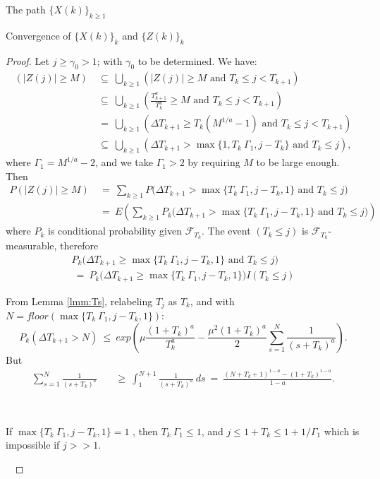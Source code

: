 \documentclass[12pt]{article}
\begin{document}
\begin{section}{The path $\{X(k)\}_{k\ge1}$ }
\begin{subsection}{Convergence of $\{X(k)\}_k$ and $\{Z(k)\}_k$}
\begin{proof}
Let $j \ge \gamma_0 > 1$; with $\gamma_0$ to be determined. We have:
\begin{align*}
(|Z(j)| \ge M) &~\subseteq~ \bigcup_{k \ge 1} (|Z(j)| \ge M \text{ and } T_k \le j < T_{k+1}) \\
&~\subseteq~ \bigcup_{k \ge 1} ( \frac{T_{k+1}^a}{T_{k}^a} \ge M \text{ and } T_k \le j < T_{k+1}) \\
&~=~ \bigcup_{k \ge 1} ( \Delta T_{k+1} \ge T_{k}(M^{1/a} -1) \text{ and } T_k \le j < T_{k+1}) \\
&~\subseteq~ \bigcup_{k \ge 1} ( \Delta T_{k+1} > \max\{1, T_{k} \ \Gamma_1, j - T_k\} \text{ and } T_k \le j ) ,
\end{align*}
where $\Gamma_1 = M^{1/a}-2$, and we take $\Gamma_1 > 2$ by requiring $M$ to be large enough. Then
\begin{align*}
P(|Z(j)| \ge M) &~=~ \sum_{k \ge 1} P\big( \Delta T_{k+1} > \max\{T_{k} \ \Gamma_1, j - T_k,1\} \text{ and } T_k \le j \big) \\
&~=~ E\left( \sum_{k \ge 1} P_k\big( \Delta T_{k+1} > \max\{T_{k} \ \Gamma_1, j - T_k, 1\} \text{ and } T_k \le j \big) \right) 
\end{align*}
where  $P_{k}$ is conditional probability given $\mathcal{F}_{T_k}$. The event $(T_k \le j)$ is $\mathcal{F}_{T_k}$-measurable, therefore
\begin{align*}
& P_k\Big( \Delta T_{k+1} \ge \max\{T_{k} \ \Gamma_1, j - T_k,1\} \text{ and } T_k \le j \Big)  &\\
& ~=~ P_k\Big( \Delta T_{k+1} \ge \max\{T_{k} \ \Gamma_1, j - T_k,1\}\Big) I(T_k \le j ) &
\end{align*}

From Lemma \ref{lmm:Ts}, relabeling $T_j$ as $T_k$, and with
 $N = floor(\max\{T_{k} \ \Gamma_1, j - T_k,1\})$:
$$
P_k( \Delta T_{k+1} > N) ~\le~
exp\left( 
\mu  \frac{(1+T_k)^a}{T_k^a} 
- \frac{\mu^2 (1+T_k)^a}{2} \sum_{s=1}^{N} \frac{1}{{(s+T_k)}^a}  \right).
$$
But
\begin{align*}
& \sum_{s=1}^{N} \frac{1}{{(s+T_k)}^a} &
&~\ge~ 
\int_{1}^{N+1} \frac{1}{{(s+T_k)}^a} \ ds ~=~ \frac{ (N + T_k + 1)^{1-a} - (1+T_k)^{1-a} }{1-a}. &
\end{align*}  

\  

If $\max\{T_{k} \ \Gamma_1, j - T_k,1\} = 1$ , then $T_k \ \Gamma_1 \le 1$, and $j \le 1 + T_k \le 1 + 1/\Gamma_1$ which is impossible if $j>>1$. 

\  


\end{proof}
\end{subsection}
\end{section}
\end{document}

